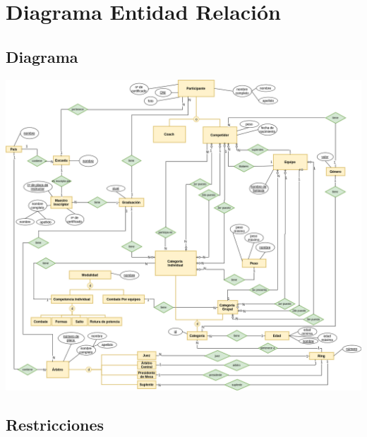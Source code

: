 \section{Diagrama Entidad Relación}
\subsection{Diagrama}

\includegraphics[scale=0.4]{der.png}

\newpage
\subsection{Restricciones}

